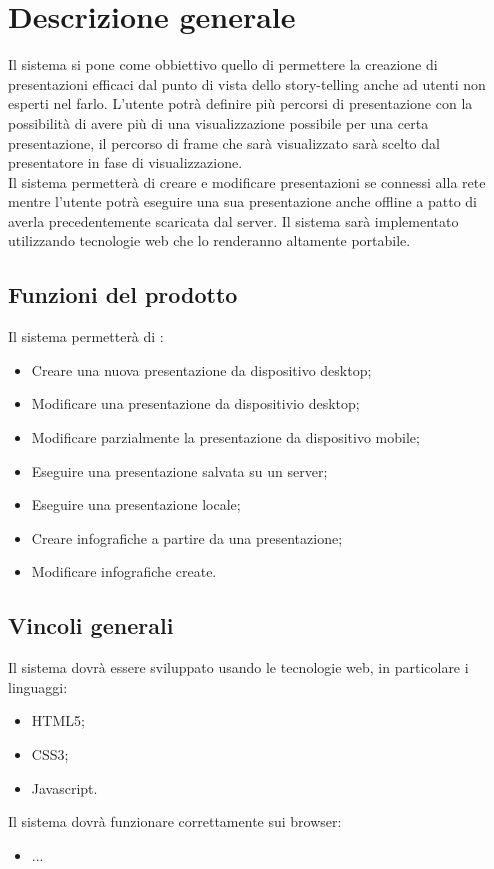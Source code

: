 \section{Descrizione generale}{
Il sistema si pone come obbiettivo quello di permettere la creazione di presentazioni efficaci dal punto di vista dello story-telling anche ad utenti non esperti nel farlo.
L'utente potrà definire più percorsi di presentazione con la possibilità di avere più di una visualizzazione possibile per una certa presentazione, il percorso di frame che sarà visualizzato sarà scelto dal presentatore in fase di visualizzazione.\\
Il sistema permetterà di creare e modificare presentazioni se connessi alla rete mentre l'utente potrà eseguire una sua presentazione anche offline a patto di averla precedentemente scaricata dal server.
Il sistema sarà implementato utilizzando tecnologie web che lo renderanno altamente portabile.

\subsection{Funzioni del prodotto}{
	Il sistema permetterà di :
	\begin{itemize}
		\item Creare una nuova presentazione da dispositivo desktop;
		\item Modificare una presentazione da dispositivio desktop;
		\item Modificare parzialmente la presentazione da dispositivo mobile;
		\item Eseguire una presentazione salvata su un server;
		\item Eseguire una presentazione locale;
		\item Creare infografiche a partire da una presentazione;
		\item Modificare infografiche create.
	\end{itemize}
}
\subsection{Vincoli generali}{
	Il sistema dovrà essere sviluppato usando le tecnologie web, in particolare i linguaggi:
	\begin{itemize}
		\item HTML5;
		\item CSS3;
		\item Javascript.
	\end{itemize}
	
	\noindent
	Il sistema dovrà funzionare correttamente sui browser:
	\begin{itemize}
	\item ...
	\end{itemize}
	}
}
